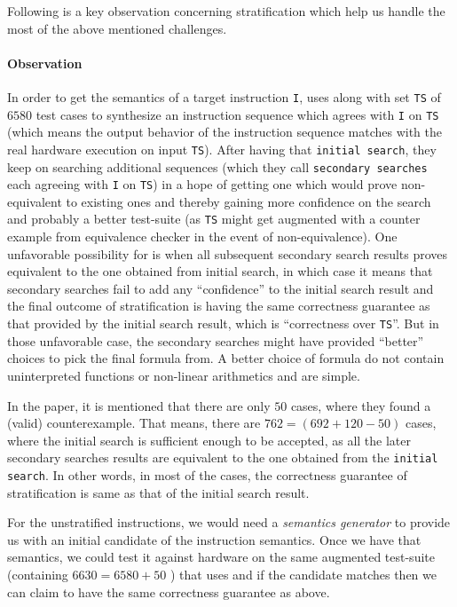 Following is a key observation concerning stratification which help us handle the most of the above mentioned challenges.

\paragraph{Observation}
     In order to get the semantics of a target instruction {\tt I}, \Strata uses \Stoke along with set {\tt TS} of $6580$ test cases to synthesize an instruction sequence which agrees with {\tt I} on {\tt TS} (which means the output behavior of the instruction sequence matches with the real hardware execution on input {\tt TS}). After having that {\tt initial search}, they keep on searching  additional sequences (which they call {\tt secondary searches} each agreeing with {\tt I} on {\tt TS}) in a hope of getting  one which would prove non-equivalent to existing ones and thereby gaining more confidence on the search and probably a better test-suite (as {\tt TS} might get augmented with a counter example from equivalence checker in the event of non-equivalence). One unfavorable possibility for \Strata is when all subsequent secondary search results proves  equivalent to the one obtained from initial search, in which case it  means that  secondary searches fail to add any ``confidence'' to the initial search result and the final outcome of stratification is having the same correctness guarantee as that provided by the initial search result, which is ``correctness over {\tt TS}''. But in those unfavorable case, the secondary searches might have provided ``better'' choices to pick the final formula from. A better choice of formula do not contain uninterpreted functions or  non-linear arithmetics  and are simple.  
    
   In the paper\cite{Heule2016a}, it is mentioned that there are only $50$ cases, where they found a (valid) counterexample. That means, there are $762 = (692 + 120 - 50)$ cases, where the initial search is sufficient enough to be accepted, as all the later secondary searches results are equivalent to the one obtained from the {\tt initial search}. In other words, in  most of the cases, the correctness guarantee of stratification is same as that of the initial search result. 
   
   For the unstratified instructions, we would need a \emph{semantics generator} to provide us with an initial candidate of the instruction semantics. Once we have that semantics, we could test it against hardware on the same augmented test-suite (containing $6630 = 6580 + 50$ ) that \Stoke uses and if the candidate  matches then we can claim to have the same correctness guarantee as above. 
   
